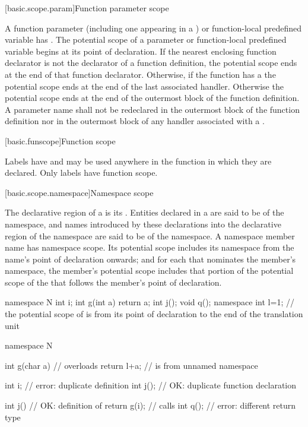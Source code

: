 [basic.scope.param]{Function parameter scope}

\pnum
{}%
%
%
A function parameter
(including one appearing in a
)
or function-local predefined variable
has .
The potential scope of a parameter
or function-local predefined variable
begins at its point of declaration. If
the nearest enclosing function declarator
is not the declarator of a function definition,
the potential scope ends at the end of that function declarator.
Otherwise, if
the function has a  the potential scope
ends at the end of the last associated handler.
Otherwise the potential scope ends
at the end of the outermost block of the function definition. A
parameter name shall not be redeclared in the outermost block of the
function definition nor in the outermost block of any handler associated
with a .

[basic.funscope]{Function scope}

\pnum
{}%
Labels have  and
may be used anywhere in the function in which they are declared. Only
labels have function scope.

[basic.scope.namespace]{Namespace scope}

\pnum
{}%
The declarative region of a  is its
.  Entities declared in a
 are said to be  of the
namespace, and names introduced by these declarations into the
declarative region of the namespace are said to be  of the namespace. A namespace member name has namespace scope.
Its potential scope includes its namespace from the name's point of
declaration onwards; and for each
 that nominates the
member's namespace, the member's potential scope includes that portion
of the potential scope of the  that follows
the member's point of declaration. \begin{example}

\begin{codeblock}
namespace N {
  int i;
  int g(int a) { return a; }
  int j();
  void q();
}
namespace { int l=1; }
// the potential scope of  is from its point of declaration to the end of the translation unit

namespace N {
  int g(char a) {   // overloads 
    return l+a;     //  is from unnamed namespace
  }

  int i;            // error: duplicate definition
  int j();          // OK: duplicate function declaration

  int j() {         // OK: definition of 
    return g(i);    // calls 
  }
  int q();          // error: different return type
}
\end{codeblock}
\end{example}


